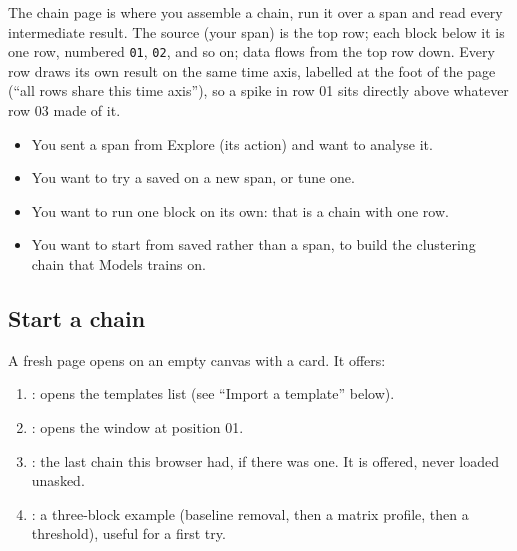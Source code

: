 The chain page is where you assemble a chain, run it over a span and read every intermediate
result. The source (your span) is the top row; each block below it is one row, numbered
\texttt{01}, \texttt{02}, and so on; data flows from the top row down. Every row draws its own
result on the same time axis, labelled at the foot of the page (``all rows share this time
axis''), so a spike in row 01 sits directly above whatever row 03 made of it.

\begin{itemize}
  \item You sent a span from Explore (its  action) and want to analyse it.
  \item You want to try a saved  on a new span, or tune one.
  \item You want to run one block on its own: that is a chain with one row.
  \item You want to start from saved  rather than a span, to build
        the clustering chain that Models trains on.
\end{itemize}



\subsection*{Start a chain}
A fresh page opens on an empty canvas with a  card. It offers:
\begin{enumerate}
  \item {}: opens the templates list (see ``Import a template'' below).
  \item {}: opens the  window at position 01.
  \item {}: the last chain this browser had, if there was one. It is offered,
        never loaded unasked.
  \item {}: a three-block example (baseline removal, then a matrix profile,
        then a threshold), useful for a first try.
\end{enumerate}

